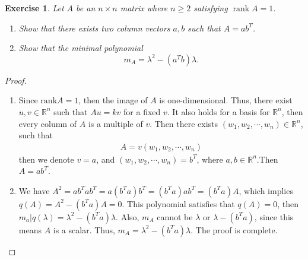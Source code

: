 \documentclass[10pt]{book}
\newtheorem{exercise}{Exercise}[section]
\theoremstyle{definition}
\numberwithin{equation}{chapter}
\begin{document}
\medskip

\begin{exercise}
Let $A$ be an $n\times n$ matrix where $n\geq2$ satisfying
$\operatorname*{rank}A=1$.
\begin{enumerate}[label=(\alph*)]
    \item Show that there exists two column vectors $a,b$ such that $A=ab^{T}$.
    \item Show that the minimal polynomial
    $$m_{A}=\lambda^{2}-\left(  a^{T}b\right)  \lambda.$$
\end{enumerate}
\end{exercise}
\begin{proof}
~\begin{enumerate}[label=(\alph*)]
    \item Since $\text{rank}A=1$, then the image of $A$ is one-dimensional. Thus, there exist $u,v\in \mathbb{R}^n$ such that $Au=kv$ for a fixed $v$. It also holds for a basis for $\mathbb{R}^n$, then every column of $A$ is a multiple of $v$. Then there exists $(w_1, w_2,\cdots,w_n)\in\mathbb{R}^n$, such that
    \begin{align*}
        A=v(w_1, w_2,\cdots,w_n)
    \end{align*}
    then we denote $v=a$, and $(w_1, w_2, \cdots, w_n) = b^T$, where $a,b\in\mathbb{R}^n$.Then $A=ab^T$.
    \item We have $A^2 = ab^Tab^T = a(b^Ta)b^T = (b^Ta)ab^T = (b^Ta)A$, which implies $q(A)=A^2-(b^Ta)A=0$. This polynomial satisfies that $q(A)=0$, then $m_a|q(\lambda) = \lambda^2-(b^Ta)\lambda$. Also, $m_A$ cannot be $\lambda$ or $\lambda-(b^Ta)$, since this means $A$ is a scalar. Thus, $m_A = \lambda^2-(b^Ta)\lambda$. The proof is complete.
\end{enumerate}
\end{proof}

\medskip
\end{document}
